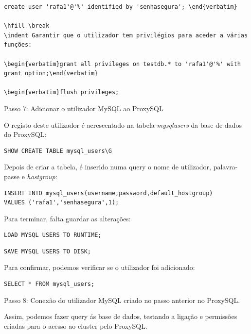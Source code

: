 \begin{verbatim}create user 'rafa1'@'%' identified by 'senhasegura'; \end{verbatim}

\hfill \break
\indent Garantir que o utilizador tem privilégios para aceder a várias funções:

\begin{verbatim}grant all privileges on testdb.* to 'rafa1'@'%' with grant option;\end{verbatim}

\begin{verbatim}flush privileges;\end{verbatim}

\hfill \break
\indent Passo 7: Adicionar o utilizador MySQL ao ProxySQL

\hfill \break
\indent O registo deste utilizador é acrescentado na tabela \textit{mysql\textunderscore users} da base de dados do ProxySQL:

\begin{verbatim}SHOW CREATE TABLE mysql_users\G\end{verbatim}

Depois de criar a tabela, é inserido numa query o nome de utilizador, palavra-passe e \textit{hostgroup}:

\begin{verbatim}INSERT INTO mysql_users(username,password,default_hostgroup) 
VALUES ('rafa1','senhasegura',1);\end{verbatim}

Para terminar, falta guardar as alterações:

\begin{verbatim}LOAD MYSQL USERS TO RUNTIME;\end{verbatim}

\begin{verbatim}SAVE MYSQL USERS TO DISK;\end{verbatim}

Para confirmar, podemos verificar se o utilizador foi adicionado:

\begin{verbatim}SELECT * FROM mysql_users;\end{verbatim}

\newpage
Passo 8: Conexão do utilizador MySQL criado no passo anterior no ProxySQL.

\hfill \break
\indent Assim, podemos fazer query ás base de dados, testando a ligação e permissões criadas para o acesso ao cluster pelo ProxySQL.

